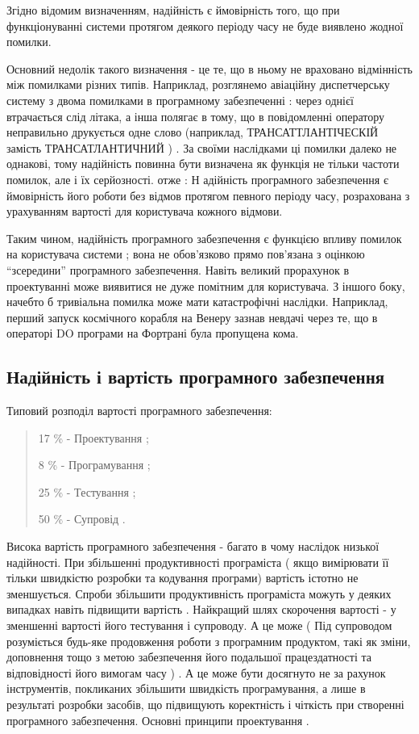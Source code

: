 Згідно відомим визначенням, надійність є ймовірність того, що при функціонуванні системи протягом деякого періоду часу не буде виявлено жодної помилки.

Основний недолік такого визначення - це те, що в ньому не враховано відмінність між помилками різних типів. Наприклад, розглянемо авіаційну диспетчерську систему з двома помилками в програмному забезпеченні : через однієї втрачається слід літака, а інша полягає в тому, що в повідомленні оператору неправильно друкується одне слово (наприклад, ТРАНСАТТЛАНТІЧЕСКІЙ замість ТРАНСАТЛАНТИЧНИЙ ) . За своїми наслідками ці помилки далеко не однакові, тому надійність повинна бути визначена як функція не тільки частоти помилок, але і їх серйозності. отже :
Н
адійність програмного забезпечення є ймовірність його роботи без відмов протягом певного періоду часу, розрахована з урахуванням вартості для користувача кожного відмови.

Таким чином, надійність програмного забезпечення є функцією впливу помилок на користувача системи ; вона не обов'язково прямо пов'язана з оцінкою ``зсередини'' програмного забезпечення. Навіть великий прорахунок в проектуванні може виявитися не дуже помітним для користувача. З іншого боку, начебто б тривіальна помилка може мати катастрофічні наслідки. Наприклад, перший запуск космічного корабля на Венеру зазнав невдачі через те, що в операторі DO програми на Фортрані була пропущена кома.

\subsection{Надійність і вартість програмного забезпечення}

Типовий розподіл вартості програмного забезпечення:
\begin{quote}

17 \% - Проектування ;

8 \% - Програмування ;

25 \% - Тестування ;

50 \% - Супровід .
\end{quote}

Висока вартість програмного забезпечення - багато в чому наслідок низької надійності. При збільшенні продуктивності програміста ( якщо вимірювати її тільки швидкістю розробки та кодування програми) вартість істотно не зменшується. Спроби збільшити продуктивність програміста можуть у деяких випадках навіть підвищити вартість . Найкращий шлях скорочення вартості - у зменшенні вартості його тестування і супроводу. А це може ( Під супроводом розуміється будь-яке продовження роботи з програмним продуктом, такі як зміни, доповнення тощо з метою забезпечення його подальшої працездатності та відповідності його вимогам часу ) . А це може бути досягнуто не за рахунок інструментів, покликаних збільшити швидкість програмування, а лише в результаті розробки засобів, що підвищують коректність і чіткість при створенні програмного забезпечення.
Основні принципи проектування .

